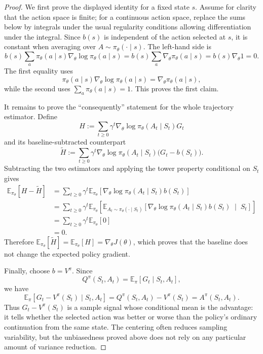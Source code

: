 \documentclass[11pt,a4paper]{article}
\theoremstyle{definition}
\begin{document}
\begin{proof}
We first prove the displayed identity for a fixed state $s$. Assume for clarity that the action
space is finite; for a continuous action space, replace the sums below by integrals under the
usual regularity conditions allowing differentiation under the integral. Since $b(s)$ is
independent of the action selected at $s$, it is constant when averaging over
$A\sim\pi_\theta(\cdot\mid s)$. The left-hand side is
\[
b(s)\sum_a\pi_\theta(a\mid s)\nabla_\theta\log\pi_\theta(a\mid s)
=b(s)\sum_a\nabla_\theta\pi_\theta(a\mid s)
=b(s)\nabla_\theta 1
=0.
\]
The first equality uses
\[
\pi_\theta(a\mid s)\nabla_\theta\log\pi_\theta(a\mid s)
=\nabla_\theta\pi_\theta(a\mid s),
\]
while the second uses $\sum_a\pi_\theta(a\mid s)=1$. This proves the first claim.

It remains to prove the ``consequently'' statement for the whole trajectory estimator. Define
\[
H
:=\sum_{t\geq0}\gamma^t
\nabla_\theta\log\pi_\theta(A_t\mid S_t)G_t
\]
and its baseline-subtracted counterpart
\[
\widetilde H
:=\sum_{t\geq0}\gamma^t
\nabla_\theta\log\pi_\theta(A_t\mid S_t)
\bigl(G_t-b(S_t)\bigr).
\]
Subtracting the two estimators and applying the tower property conditional on $S_t$ gives
\[
\begin{aligned}
\mathbb{E}_{\pi_\theta}[H-\widetilde H]
&=\sum_{t\geq0}\gamma^t
\mathbb{E}_{\pi_\theta}\!\left[
\nabla_\theta\log\pi_\theta(A_t\mid S_t)b(S_t)\right]\\
&=\sum_{t\geq0}\gamma^t
\mathbb{E}_{\pi_\theta}\!\left[
\mathbb{E}_{A_t\sim\pi_\theta(\cdot\mid S_t)}
\left[
\nabla_\theta\log\pi_\theta(A_t\mid S_t)b(S_t)
\;\middle|\;S_t
\right]\right]\\
&=\sum_{t\geq0}\gamma^t\mathbb{E}_{\pi_\theta}[0]\\
&=0.
\end{aligned}
\]
Therefore $\mathbb{E}_{\pi_\theta}[\widetilde H]
=\mathbb{E}_{\pi_\theta}[H]=\nabla_\theta J(\theta)$, which proves that the baseline does
not change the expected policy gradient.

Finally, choose $b=V^\pi$. Since
\[
Q^\pi(S_t,A_t)
=\mathbb{E}_\pi[G_t\mid S_t,A_t],
\]
we have
\[
\mathbb{E}_\pi\!\left[
G_t-V^\pi(S_t)\mid S_t,A_t
\right]
=Q^\pi(S_t,A_t)-V^\pi(S_t)
=A^\pi(S_t,A_t).
\]
Thus $G_t-V^\pi(S_t)$ is a sample signal whose conditional mean is the advantage: it tells
whether the selected action was better or worse than the policy's ordinary continuation from
the same state. The centering often reduces sampling variability, but the unbiasedness proved
above does not rely on any particular amount of variance reduction.
\end{proof}
\end{document}
